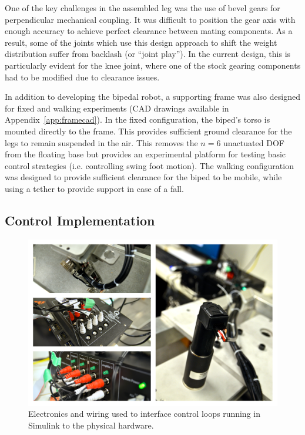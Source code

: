 One of the key challenges in the assembled leg was the use of bevel gears for perpendicular mechanical coupling. It was difficult to position the gear axis with enough accuracy to achieve perfect clearance between mating components. As a result, some of the joints which use this design approach to shift the weight distribution suffer from backlash (or ``joint play''). In the current design, this is particularly evident for the knee joint, where one of the stock gearing components had to be modified due to clearance issues. 

In addition to developing the bipedal robot, a supporting frame was also designed for fixed and walking experiments (CAD drawings available in Appendix~\ref{app:framecad}). In the fixed configuration, the biped's torso is mounted directly to the frame. This provides sufficient ground clearance for the legs to remain suspended in the air. This removes the $n = 6$ unactuated DOF from the floating base but provides an experimental platform for testing basic control strategies (i.e. controlling swing foot motion). The walking configuration was designed to provide sufficient clearance for the biped to be mobile, while using a tether to provide support in case of a fall. 

\subsection{Control Implementation} %
\label{sub:control_implementation}

\begin{figure}[!b]
	\centering
    \includegraphics[scale=0.39]{fig/hardware/bipedwired.png} 
  	\caption{Electronics and wiring used to interface control loops running in Simulink to the physical hardware.}
	\label{fig:bipedwired}
\end{figure}

